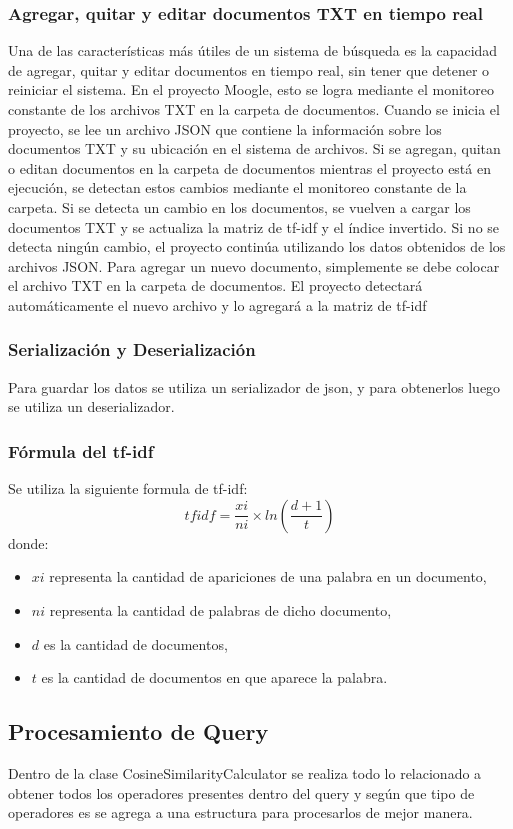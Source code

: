 \documentclass{article}
\begin{document}
\subsubsection{Agregar, quitar y editar documentos TXT en tiempo real}
Una de las características más útiles de un sistema de búsqueda es la capacidad de agregar, quitar y editar documentos en tiempo real, sin tener que detener o reiniciar el sistema. En el proyecto Moogle, esto se logra mediante el monitoreo constante de los archivos TXT en la carpeta de documentos.
Cuando se inicia el proyecto, se lee un archivo JSON que contiene la información sobre los documentos TXT y su ubicación en el sistema de archivos. Si se agregan, quitan o editan documentos en la carpeta de documentos mientras el proyecto está en ejecución, se detectan estos cambios mediante el monitoreo constante de la carpeta.
Si se detecta un cambio en los documentos, se vuelven a cargar los documentos TXT y se actualiza la matriz de tf-idf y el índice invertido. Si no se detecta ningún cambio, el proyecto continúa utilizando los datos obtenidos de los archivos JSON.
Para agregar un nuevo documento, simplemente se debe colocar el archivo TXT en la carpeta de documentos. El proyecto detectará automáticamente el nuevo archivo y lo agregará a la matriz de tf-idf 

\subsubsection{Serialización y Deserialización}
Para guardar los datos se utiliza un serializador de json, y para obtenerlos luego se utiliza un deserializador.

\subsubsection{Fórmula del tf-idf}
Se utiliza la siguiente formula de tf-idf:
\[ tfidf = \frac{xi}{ni} \times ln\left(\frac{d + 1}{t}\right) \]
donde:
\begin{itemize}
\item $xi$ representa la cantidad de apariciones de una palabra en un documento,
\item $ni$ representa la cantidad de palabras de dicho documento,
\item $d$ es la cantidad de documentos,
\item $t$ es la cantidad de documentos en que aparece la palabra.
\end{itemize}

\subsection{Procesamiento de Query}
Dentro de la clase CosineSimilarityCalculator se realiza todo lo relacionado a obtener todos los operadores presentes dentro del query y según que tipo de operadores es se agrega a una estructura para procesarlos de mejor manera.
\end{document}
